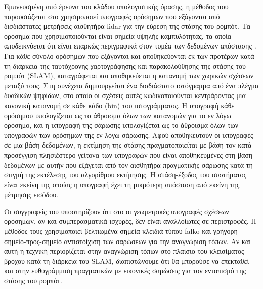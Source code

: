 Εμπνευσμένη από έρευνα του κλάδου υπολογιστικής όρασης, η μέθοδος που
παρουσιάζεται στο \cite{Himstedt2014} χρησιμοποιεί υπογραφές ορόσημων που
εξάγονται από δισδιάστατες μετρήσεις αισθητήρα lidar για την εύρεση της στάσης
του ρομπότ. Τα ορόσημα που χρησιμοποιούνται είναι σημεία υψηλής καμπυλότητας,
τα οποία αποδεικνύεται ότι είναι επαρκώς περιγραφικά στον τομέα των δεδομένων
απόστασης \cite{Tipaldi2010}. Για κάθε σύνολο ορόσημων που εξάγονται και
αποθηκεύονται εκ των προτέρων κατά τη διάρκεια της ταυτόχρονης χαρτογράφησης
και παρακολούθησης της στάσης του ρομπότ (SLAM), καταγράφεται και αποθηκεύεται η
κατανομή των χωρικών σχέσεων μεταξύ τους. Στη συνέχεια δημιουργείται ένα
δισδιάστατο ιστόγραμμα από ένα πλέγμα δυαδικών ψηφίδων, στο οποίο οι σχέσεις
αυτές κωδικοποιούνται κεντράροντας μια κανονική κατανομή σε κάθε κάδο (bin) του
ιστογράμματος. Η υπογραφή κάθε ορόσημου υπολογίζεται ως το άθροισμα όλων των
κατανομών για το εν λόγω ορόσημο, και η υπογραφή της σάρωσης υπολογίζεται
ως το άθροισμα όλων των υπογραφών των ορόσημων της εν λόγω σάρωσης.
Αφού αποθηκευτούν οι υπογραφές σε μια βάση δεδομένων, η εκτίμηση της στάσης
πραγματοποιείται με βάση τον κατά προσέγγιση πλησιέστερο γείτονα των υπογραφών
που είναι αποθηκευμένες στη βάση δεδομένων με αυτήν που εξάγεται από τον
αισθητήρα πραγματικής σάρωσης κατά τη στιγμή της εκτέλεσης του αλγορίθμου
εκτίμησης. Η στάση-έξοδος του συστήματος είναι εκείνη της οποίας η υπογραφή
έχει τη μικρότερη απόσταση από εκείνη της μέτρησης εισόδου.

Οι συγγραφείς του \cite{Kallasi2016} υποστηρίζουν ότι στο \cite{Himstedt2014} οι
γεωμετρικές υπογραφές σχέσεων ορόσημων, αν και συμπερασματικά ισχυρές, δεν
είναι αναλλοίωτες σε περιστροφές. Η μέθοδος τους χρησιμοποιεί βελτιωμένα
σημεία-κλειδιά τύπου falko και γρήγορη σημείο-προς-σημείο αντιστοίχιση των
σαρώσεων για την αναγνώριση τόπων. Αν και αυτή η τεχνική περιορίζεται στην
αναγνώριση τόπων στο πλαίσιο του κλεισίματος βρόχου κατά τη διάρκεια του SLAM,
διαπιστώνουμε ότι θα μπορούσε να επεκταθεί και στην ευθυγράμμιση πραγματικών με
εικονικές σαρώσεις για τον εντοπισμό της στάσης του ρομπότ.

